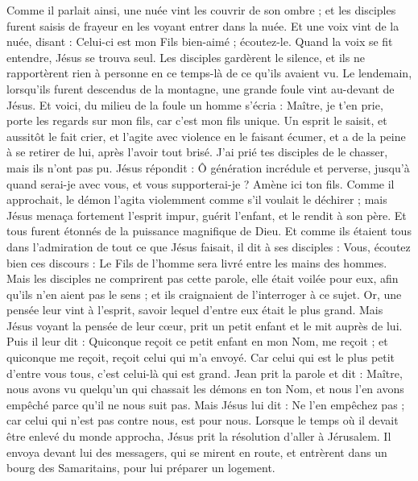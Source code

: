 \begin{multicols}{2}
{Comme il parlait ainsi, une nuée vint les couvrir de son ombre ; et les disciples furent saisis de frayeur en les voyant entrer dans la nuée.
Et une voix vint de la nuée, disant : Celui-ci est mon Fils bien-aimé ; écoutez-le.
Quand la voix se fit entendre, Jésus se trouva seul. Les disciples gardèrent le silence, et ils ne rapportèrent rien à personne en ce temps-là de ce qu'ils avaient vu.
Le lendemain, lorsqu’ils furent descendus de la montagne, une grande foule vint au-devant de Jésus.
Et voici, du milieu de la foule un homme s'écria : Maître, je t’en prie, porte les regards sur mon fils, car c’est mon fils unique.
Un esprit le saisit, et aussitôt le fait crier, et l'agite avec violence en le faisant écumer, et a de la peine à se retirer de lui, après l'avoir tout brisé.
J’ai prié tes disciples de le chasser, mais ils n'ont pas pu.
Jésus répondit : Ô génération incrédule et perverse, jusqu’à quand serai-je avec vous, et vous supporterai-je ? Amène ici ton fils.
Comme il approchait, le démon l'agita violemment comme s'il voulait le déchirer ; mais Jésus menaça fortement l'esprit impur, guérit l'enfant, et le rendit à son père.
Et tous furent étonnés de la puissance magnifique de Dieu. Et comme ils étaient tous dans l’admiration de tout ce que Jésus faisait, il dit à ses disciples :
Vous, écoutez bien ces discours : Le Fils de l'homme sera livré entre les mains des hommes.
Mais les disciples ne comprirent pas cette parole, elle était voilée pour eux, afin qu’ils n’en aient pas le sens ; et ils craignaient de l'interroger à ce sujet.
\TextTitle{[grandeur]}
Or, une pensée leur vint à l’esprit, savoir lequel d'entre eux était le plus grand.
Mais Jésus voyant la pensée de leur cœur, prit un petit enfant et le mit auprès de lui.
Puis il leur dit : Quiconque reçoit ce petit enfant en mon Nom, me reçoit ; et quiconque me reçoit, reçoit celui qui m'a envoyé. Car celui qui est le plus petit d'entre vous tous, c'est celui-là qui est grand.
\TextTitle{[grandeur]}
Jean prit la parole et dit : Maître, nous avons vu quelqu'un qui chassait les démons en ton Nom, et nous l'en avons empêché parce qu'il ne nous suit pas.
Mais Jésus lui dit : Ne l'en empêchez pas ; car celui qui n'est pas contre nous, est pour nous.
Lorsque le temps où il devait être enlevé du monde approcha, Jésus prit la résolution d'aller à Jérusalem.
Il envoya devant lui des messagers, qui se mirent en route, et entrèrent dans un bourg des Samaritains, pour lui préparer un logement.
}
\end{multicols}
